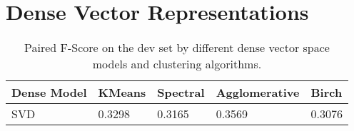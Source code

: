 \documentclass[12pt]{article}
\begin{document}
\section{Dense Vector Representations}



\begin{table}[!h]
\centering
\begin{tabular}{l|l|l|l|l}
Dense Model	& KMeans	& Spectral		& Agglomerative	& Birch \\
\hline
SVD			& 0.3298	& 0.3165		& 0.3569			& 0.3076 \\
\end{tabular}
\caption{Paired F-Score on the dev set by different dense vector space models and clustering algorithms.}
\label{tab:denseresults}
\end{table}
\end{document}
